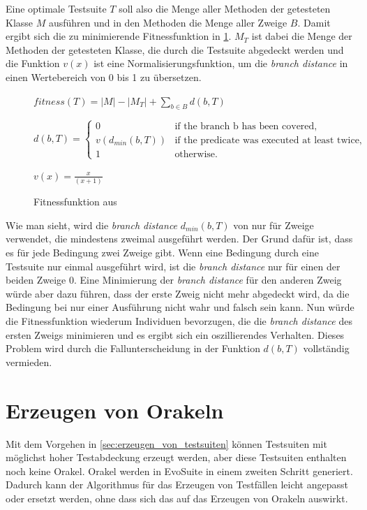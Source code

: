 \documentclass[a4paper,11pt]{article}
\begin{document}
Eine optimale Testsuite $T$ soll also die Menge aller Methoden der getesteten Klasse $M$ ausführen und in den Methoden die Menge aller Zweige $B$.
Damit ergibt sich die zu minimierende Fitnessfunktion in \cref{fig:fitnessfunktion}.
$M_T$ ist dabei die Menge der Methoden der getesteten Klasse, die durch die Testsuite abgedeckt werden und die Funktion $v(x)$ ist eine Normalisierungsfunktion, um die \textit{branch distance} in einen Wertebereich von 0 bis 1 zu übersetzen.

\begin{figure}[h]
	$fitness(T) = |M| - |M_T| + \sum\limits_{b \in B} d(b, T)$

	$d(b, T) = \begin{cases}
	0 & \text{if the branch b has been covered,}\\
	v(d_{min}(b, T)) & \text{if the predicate was executed at least twice,}\\
	1 & \text{otherwise.}
	\end{cases}$

	$v(x) = \frac{x}{(x+1)}$
	\caption{Fitnessfunktion aus \cite{TSE12_EvoSuite}}
	\label{fig:fitnessfunktion}
\end{figure}

Wie man sieht, wird die \textit{branch distance} $d_{min}(b, T)$ von \citet{10.1109/32.57624} nur für Zweige verwendet, die mindestens zweimal ausgeführt werden.
Der Grund dafür ist, dass es für jede Bedingung zwei Zweige gibt.
Wenn eine Bedingung durch eine Testsuite nur einmal ausgeführt wird, ist die \textit{branch distance} nur für einen der beiden Zweige 0.
Eine Minimierung der \textit{branch distance} für den anderen Zweig würde aber dazu führen, dass der erste Zweig nicht mehr abgedeckt wird, da die Bedingung bei nur einer Ausführung nicht wahr und falsch sein kann.
Nun würde die Fitnessfunktion wiederum Individuen bevorzugen, die die \textit{branch distance} des ersten Zweigs minimieren und es ergibt sich ein oszillierendes Verhalten.
Dieses Problem wird durch die Fallunterscheidung in der Funktion $d(b, T)$ vollständig vermieden.

\section{Erzeugen von Orakeln}
\label{sec:erzeugen_von_orakeln}

Mit dem Vorgehen in \cref{sec:erzeugen_von_testsuiten} können Testsuiten mit möglichst hoher Testabdeckung erzeugt werden, aber diese Testsuiten enthalten noch keine Orakel.
Orakel werden in EvoSuite in einem zweiten Schritt generiert.
Dadurch kann der Algorithmus für das Erzeugen von Testfällen leicht angepasst oder ersetzt werden, ohne dass sich das auf das Erzeugen von Orakeln auswirkt.
\end{document}
